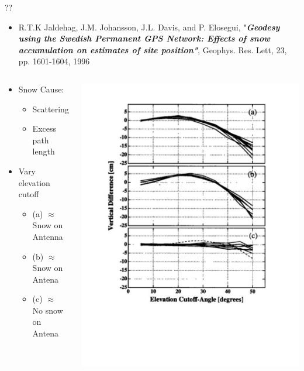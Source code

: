 \documentclass{beamer}
\begin{document}
\begin{frame}{??}
  \begin{itemize}
  \item R.T.K Jaldehag, J.M. Johansson, J.L. Davis, and P. Elosegui, "\emph{\bf Geodesy using the Swedish Permanent GPS Network: Effects of snow accumulation on estimates of site position"}, Geophys. Res. Lett, 23, pp. 1601-1604, 1996
  \end{itemize}

  \begin{columns}[t]
    \begin{block}{ }
      \begin{itemize}
      \item Snow Cause:
        \begin{itemize}
        \item Scattering
        \item Excess path length
        \end{itemize}
      \item Vary elevation cutoff
        \begin{itemize}
        \item (a) $\approx$ Snow on Antenna
        \item (b) $\approx$ Snow on Antena
        \item (c) $\approx$ No snow on Antena
        \end{itemize}
      \end{itemize}
    \end{block}

    \begin{block}{ }
      \includegraphics[width=0.8\linewidth,clip=true]{logan/paper.pdf}
    \end{block}
  \end{columns}

\end{frame}
\end{document}
